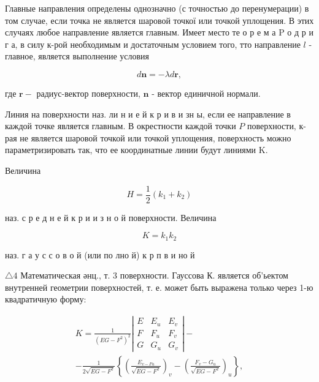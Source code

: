 \documentclass[10pt]{article}
\begin{document}
Главные направления определены однозначно (с точностью до перенумерации) в том случае, если точка не является шаровой точкої или точкой уплощения. В этих случаях любое направление является главным. Имеет место те о р е м а $\mathrm{P}$ о д р и г а, в силу к-рой необходимым и достаточным условием того, тто направление $l$ - главное, является выполнение условия



\[

d \boldsymbol{n}=-\lambda d \boldsymbol{r},

\]



где $\boldsymbol{r}-$ радиус-вектор поверхности, $\boldsymbol{n}$ - вектор единичной нормали.



Линия на поверхности наз. ли н и е й к р и в и зн ы, если ее направление в каждой точке является главным. В окрестности каждой точки $P$ поверхности, к-рая не является шаровой точкой или точкой уплощения, поверхность можно параметризировать так, что ее координатные линии будут линиями $\mathrm{K}$.



Величина



\[

H=\frac{1}{2}\left(k_{1}+k_{2}\right)

\]



наз. с р е д н е й к р и и з н о й поверхности. Величина



\[

K=k_{1} k_{2}

\]



наз. г а у с с о в о й (или по лно й) к р п в и но й



$\triangle 4$ Математическая әнц., т. 3 поверхности. Гауссова К. является об'ьектом внутренней геометрии поверхностей, т. е. может быть выражена только через 1-ю квадратичную форму:



\[

\begin{gathered}

K=\frac{1}{\left(E G-F^{2}\right)^{2}}\left|\begin{array}{lll}

E & E_{u} & E_{v} \\

F & F_{u} & F_{v} \\

G & G_{u} & G_{v}

\end{array}\right|- \\

-\frac{1}{2 \sqrt{E G-F^{2}}}\left\{\left(\frac{E_{v-F u}}{\sqrt{E G-F^{2}}}\right)_{v}-\left(\frac{F_{v}-G_{u}}{\sqrt{E G-F^{2}}}\right)_{u}\right\},

\end{gathered}

\]
\end{document}
